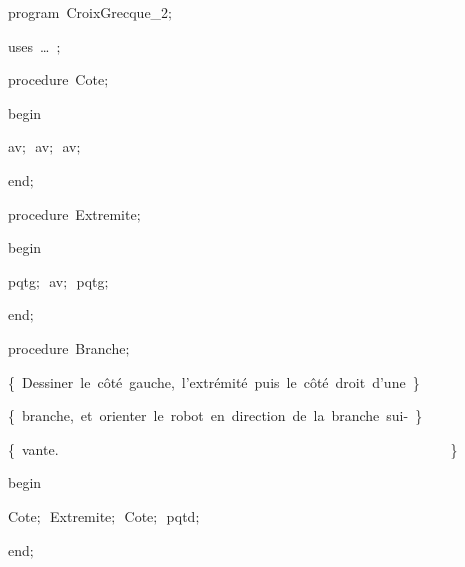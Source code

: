 
{
\parindent {}
\medskip

\carrenoir
\vspace{\neglskip}\mbox{\blc  \idt  \mcl program\idt \ CroixGrecque\_2$;$
}\par 
\vspace{\neglskip}\mbox{\blc \blk\idt \mcl uses\idt \ \ldots\ $;$
}\par 
\medskip

\pagebreak[3] 
\vspace{\neglskip}\mbox{\blc  \blk\idt  \mcl procedure\idt \ Cote$;$}\par 
\vspace{\neglskip}\mbox{\blc  \blk\idt  \mcl begin\idt }\par 
\vspace{\neglskip}\mbox{\blc  \blk\blk\idt  av$;$\ av$;$\ av$;$\ }\par 
\vspace{\neglskip}\mbox{\blc  \blk\idt  \mcl end\idt $;$}\par 
\medskip

\pagebreak[3] 
\vspace{\neglskip}\mbox{\blc  \blk\idt  \mcl procedure\idt \ Extremite$;$}\par 
\vspace{\neglskip}\mbox{\blc  \blk\idt  \mcl begin\idt }\par 
\vspace{\neglskip}\mbox{\blc  \blk\blk\idt  pqtg$;$\ av$;$\ pqtg$;$\ }\par 
\vspace{\neglskip}\mbox{\blc  \blk\idt  \mcl end\idt $;$}\par 
\medskip

\pagebreak[3] 
\vspace{\neglskip}\mbox{\blc  \blk\idt  \mcl procedure\idt \ Branche$;$}\par 
\vspace{\neglskip}\mbox{\blc  \blk\blk\idt  \cmt  \{\ Dessiner\ le\ côté\ gauche,\ l{'}extrémité\ puis\ le\ côté\ droit\ d{'}une\ \}\idt }\par 
\vspace{\neglskip}\mbox{\blc  \blk\blk\idt  \cmt  \{\ branche,\ et\ orienter\ le\ robot\ en\ direction\ de\ la\ branche\ sui-\ \}\idt }\par 
\vspace{\neglskip}\mbox{\blc  \blk\blk\idt  \cmt  \{\ vante.\ \ \ \ \ \ \ \ \ \ \ \ \ \ \ \ \ \ \ \ \ \ \ \ \ \ \ \ \ \ \ \ \ \ \ \ \ \ \ \ \ \ \ \ \ \ \ \ \ \ \ \ \ \ \ \ \}\idt }\par 
\vspace{\neglskip}\mbox{\blc  \blk\idt  \mcl begin\idt }\par 
\vspace{\neglskip}\mbox{\blc  \blk\blk\idt  Cote$;$\ Extremite$;$\ Cote$;$\ pqtd$;$\ }\par 
\vspace{\neglskip}\mbox{\blc  \blk\idt  \mcl end\idt $;$}\par 
\medskip

}
